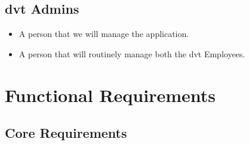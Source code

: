 \documentclass[hidelinks, 12pt, a4paper]{article}
\begin{document}
\subsection{dvt Admins}
\begin{itemize}
    \item A person that we will manage the application.
    \item A person that will routinely manage both the dvt Employees.
\end{itemize}

\pagebreak

\section{Functional Requirements}

\subsection{Core Requirements}
\end{document}
